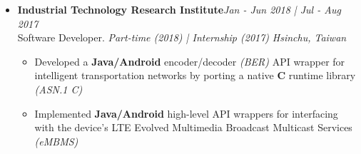 \begin{itemize}[leftmargin=0pt, label={}]
\item{
{\sectionheading\large{\textbf{Industrial Technology Research Institute}}}\hfill {\sectionheading\small{\textit{Jan - Jun 2018 | Jul - Aug 2017}}}\\
{\sectionheading\small{Software Developer. \textit{Part-time (2018) | Internship (2017)}}}\hfill
{\sectionheading\small{\textit{Hsinchu, Taiwan}}}

    \vspace{-6pt}
    \begin{itemize}[label=\textbullet, leftmargin=*, noitemsep]
        \item{Developed a \textbf{Java/Android} encoder/decoder \textit{(BER)} API wrapper for intelligent transportation networks by porting a native \textbf{C} runtime library \textit{(ASN.1 C)}}
        \item{Implemented \textbf{Java/Android} high-level API wrappers for interfacing with the device's LTE Evolved Multimedia Broadcast Multicast Services \textit{(eMBMS)}}
    \end{itemize}
}

% 


\end{itemize}
